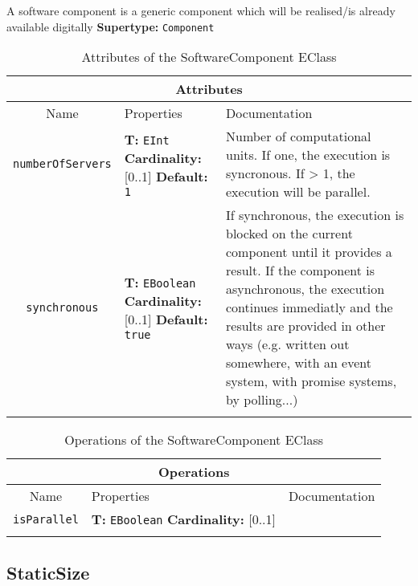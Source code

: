 \documentclass{article}
\begin{document}
A software component is a generic component which will be realised/is already available digitally
\textbf{Supertype: }\texttt{Component}
\begin{table}[H]
\footnotesize
\begin{tabularx}{\textwidth}{|c| p{4 cm} | X |}
\hline
\multicolumn{3}{|c|}{\textbf{Attributes}} \\
\hline
Name & Properties & Documentation \\ \hline \hline
\texttt{numberOfServers}
 & 
\textbf{T:} \texttt{EInt}
\newline
\textbf{Cardinality:} [0..1]
\newline
\textbf{Default:} \texttt{1}
 & Number of computational units. If one, the execution is syncronous. If > 1, the execution will be parallel.\\ \hline
\texttt{synchronous}
 & 
\textbf{T:} \texttt{EBoolean}
\newline
\textbf{Cardinality:} [0..1]
\newline
\textbf{Default:} \texttt{true}
 & If synchronous, the execution is blocked on the current component until it provides a result. If the component is asynchronous, the execution continues immediatly and the results are provided in other ways (e.g. written out somewhere, with an event system, with promise systems, by polling...)\\ \hline
\caption{Attributes of the SoftwareComponent EClass}
\end{tabularx}
\label{e4smSoftwareComponentattr}
\end{table}
\begin{table}[H]
\footnotesize
\begin{tabularx}{\textwidth}{|c| p{4 cm} | X |}
\hline
\multicolumn{3}{|c|}{\textbf{Operations}} \\
\hline
Name & Properties & Documentation \\ \hline \hline
\texttt{isParallel}
 & 
\textbf{T:} \texttt{EBoolean}
\newline
\textbf{Cardinality:} [0..1]
 & \\ \hline
\caption{Operations of the SoftwareComponent EClass}
\end{tabularx}
\label{e4smSoftwareComponentop}
\end{table}
\subsection[StaticSize]{StaticSize}
\label{e4smStaticSize}
\end{document}
